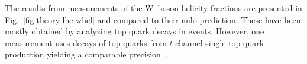 
The results from measurements of the $\mathrm{W}$~boson helicity fractions are presented in Fig.~\ref{fig:theory-lhc-whel} and compared to their \gls{nnlo} prediction. These have been mostly obtained by analyzing top quark decays in \ttbar events. However, one measurement uses decays of top quarks from $t$-channel single-top-quark production yielding a comparable precision~\cite{Khachatryan:2014vma}.

